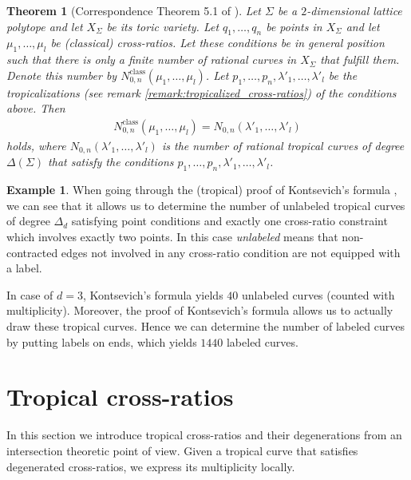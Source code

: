 \documentclass[11pt,reqno,a4]{amsart}
\theoremstyle{dotless}
\newtheorem{theorem}[corollary]{Theorem}
\theoremstyle{definition}
\newtheorem{example}[corollary]{Example}
\begin{document}
\begin{theorem}[Correspondence Theorem 5.1 of \cite{IlyaCRC}]\label{thm:correspondence_thm_CRC}
Let $\Sigma$ be a $2$-dimensional lattice polytope and let $X_\Sigma$ be its toric variety. Let $q_1,\dots,q_n$ be points in $X_\Sigma$ and let $\mu_1,\dots,\mu_l$ be (classical) cross-ratios. Let these conditions be in general position such that there is only a finite number of rational curves in $X_\Sigma$ that fulfill them. Denote this number by $N^{\textrm{class}}_{0,n}\left( \mu_1,\dots,\mu_l \right)$. Let $p_1,\dots,p_n,\lambda'_1,\dots,\lambda'_l$ be the tropicalizations (see remark \ref{remark:tropicalized_cross-ratios}) of the conditions above. Then
\begin{align*}
N^{\textrm{class}}_{0,n}\left( \mu_1,\dots,\mu_l \right)
=
N_{0,n}\left(\lambda'_1,\dots,\lambda'_l\right)
\end{align*}
holds, where $N_{0,n}\left(\lambda'_1,\dots,\lambda'_l\right)$ is the number of rational tropical curves of degree $\Delta(\Sigma)$ that satisfy the conditions $p_1,\dots,p_n,\lambda'_1,\dots,\lambda'_l$.
\end{theorem}


\begin{example}\label{example:Kontsevich_CR}
When going through the (tropical) proof of Kontsevich's formula \cite{KontsevichPaper}, we can see that it allows us to determine the number of unlabeled tropical curves of degree $\Delta_d$ satisfying point conditions and exactly one cross-ratio constraint which involves exactly two points. In this case \textit{unlabeled} means that non-contracted edges not involved in any cross-ratio condition are not equipped with a label.

In case of $d=3$, Kontsevich's formula yields $40$ unlabeled curves (counted with multiplicity). Moreover, the proof of Kontsevich's formula allows us to actually draw these tropical curves. Hence we can determine the number of labeled curves by putting labels on ends, which yields $1440$ labeled curves.
\end{example}




\section{Tropical cross-ratios}\label{section:tropical_cross-ratios}

In this section we introduce tropical cross-ratios and their degenerations from an intersection theoretic point of view. Given a tropical curve that satisfies degenerated cross-ratios, we express its multiplicity locally.
\end{document}
